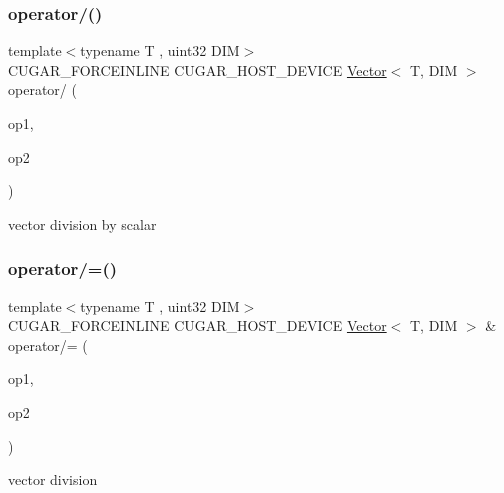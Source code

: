 \subsubsection{\texorpdfstring{operator/()}{operator/()}\hspace{0.1cm}{\footnotesize\ttfamily [2/2]}}
{\footnotesize\ttfamily template$<$typename T , uint32 D\+IM$>$ \\
C\+U\+G\+A\+R\+\_\+\+F\+O\+R\+C\+E\+I\+N\+L\+I\+NE C\+U\+G\+A\+R\+\_\+\+H\+O\+S\+T\+\_\+\+D\+E\+V\+I\+CE \hyperlink{structcugar_1_1_vector}{Vector}$<$ T, D\+IM $>$ operator/ (\begin{DoxyParamCaption}\item[{const \hyperlink{structcugar_1_1_vector}{Vector}$<$ T, D\+IM $>$ \&}]{op1,  }\item[{const T}]{op2 }\end{DoxyParamCaption})\hspace{0.3cm}{\ttfamily [related]}}

vector division by scalar \mbox{\label{group___vectors_module_ga8b304f19895e1b31e9e736dcad94f019}} 
\subsubsection{\texorpdfstring{operator/=()}{operator/=()}\hspace{0.1cm}{\footnotesize\ttfamily [1/2]}}
{\footnotesize\ttfamily template$<$typename T , uint32 D\+IM$>$ \\
C\+U\+G\+A\+R\+\_\+\+F\+O\+R\+C\+E\+I\+N\+L\+I\+NE C\+U\+G\+A\+R\+\_\+\+H\+O\+S\+T\+\_\+\+D\+E\+V\+I\+CE \hyperlink{structcugar_1_1_vector}{Vector}$<$ T, D\+IM $>$ \& operator/= (\begin{DoxyParamCaption}\item[{\hyperlink{structcugar_1_1_vector}{Vector}$<$ T, D\+IM $>$ \&}]{op1,  }\item[{const \hyperlink{structcugar_1_1_vector}{Vector}$<$ T, D\+IM $>$ \&}]{op2 }\end{DoxyParamCaption})\hspace{0.3cm}{\ttfamily [related]}}

vector division \mbox{\label{group___vectors_module_ga8da7e747d2c0fc0217e1a63fbad736d7}} 
